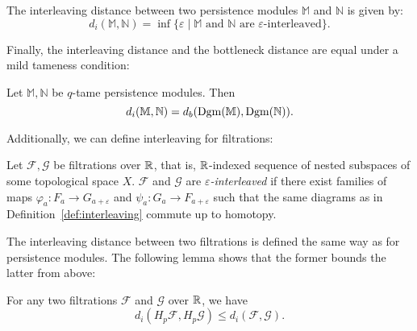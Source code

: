 \begin{definition}
    The interleaving distance between two persistence modules $\mathbb{M}$ and
    $\mathbb{N}$ is given by:
    \begin{equation}
        d_i(\mathbb{M}, \mathbb{N}) = \inf \{\varepsilon \mid \text{$\mathbb{M}$ and $\mathbb{N}$ are $\varepsilon$-interleaved}\}.
    \end{equation}
\end{definition}

Finally, the interleaving distance and the bottleneck distance are equal under a
mild tameness condition:
\begin{theorem}
    \label{thm:isometry}
    Let $\mathbb{M}, \mathbb{N}$ be $q$-tame persistence modules. Then
    \begin{equation}
        d_i(\mathbb{M}, \mathbb{N}) = d_b(\operatorname{Dgm}(\mathbb{M}), \operatorname{Dgm}(\mathbb{N})).
    \end{equation}
\end{theorem}

Additionally, we can define interleaving for filtrations:
\begin{definition}
    Let $\mathcal{F}, \mathcal{G}$ be filtrations over $\mathbb{R}$, that is,
    $\mathbb{R}$-indexed sequence of nested subspaces of some topological space $X$.
    $\mathcal{F}$ and $\mathcal{G}$ are \emph{$\varepsilon$-interleaved}
    if there exist families of maps $\varphi_a : F_a \to G_{a + \varepsilon}$
    and $\psi_a : G_a \to F_{a + \varepsilon}$ such that the same diagrams as in
    Definition~\ref{def:interleaving} commute up to homotopy.
\end{definition}
The interleaving distance between two filtrations is defined the same way as for
persistence modules. The following lemma shows that the former bounds the latter
from above:
\begin{lemma}
    \label{lem:interleaving_distance}
    For any two filtrations $\mathcal{F}$ and $\mathcal{G}$ over $\mathbb{R}$, we
    have
    \begin{equation}
        d_i(H_p \mathcal{F}, H_p \mathcal{G}) \leq d_i(\mathcal{F}, \mathcal{G}).
    \end{equation}
\end{lemma}

